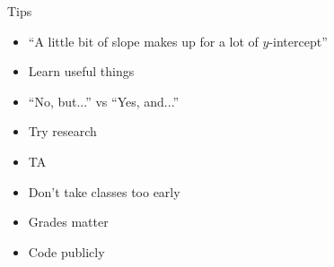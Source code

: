 \documentclass{beamer}
\begin{document}
\begin{frame}{Tips}
  \begin{itemize}
    \pause
    \item ``A little bit of slope makes up for a lot of $y$-intercept'' \pause
    \item Learn useful things \pause
    \item ``No, but...'' vs ``Yes, and...'' \pause
    \item Try research \pause
    \item TA \pause
    \item Don't take classes too early \pause
    \item Grades matter \pause
    \item Code publicly \pause
  \end{itemize}
\end{frame}
\end{document}
